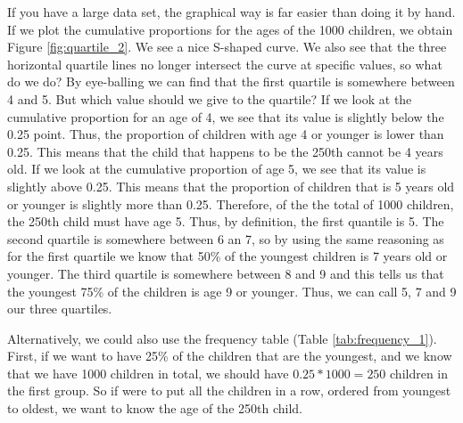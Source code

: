 \begin{kframe}


{\ttfamily\noindent\bfseries{}}\end{kframe}

If you have a large data set, the graphical way is far easier than doing it by hand. If we plot the cumulative proportions for the ages of the 1000 children, we obtain Figure \ref{fig:quartile_2}. We see a nice S-shaped curve. We also see that the three horizontal quartile lines no longer intersect the curve at specific values, so what do we do? By eye-balling we can find that the first quartile is somewhere between 4 and 5. But which value should we give to the quartile? If we look at the cumulative proportion for an age of 4, we see that its value is slightly below the 0.25 point. Thus, the proportion of children with age 4 or younger is lower than 0.25. This means that the child that happens to be the 250th cannot be 4 years old. If we look at the cumulative proportion of age 5, we see that its value is slightly above 0.25. This means that the proportion of children that is 5 years old or younger is slightly more than 0.25. Therefore, of the the total of 1000 children, the 250th child must have age 5. Thus, by definition, the first quantile is 5. 
The second quartile is somewhere between 6 an 7, so by using the same reasoning as for the first quartile we know that 50\% of the youngest children is 7 years old or younger. The third quartile is somewhere between 8 and 9 and this tells us that the youngest 75\% of the children is age 9 or younger. Thus, we can call 5, 7 and 9 our three quartiles.



\begin{kframe}


{\ttfamily\noindent\bfseries{}}\end{kframe}


Alternatively, we could also use the frequency table (Table \ref{tab:frequency_1}). First, if we want to have 25\% of the children that are the youngest, and we know that we have 1000 children in total, we should have $0.25 * 1000=250$ children in the first group. So if were to put all the children in a row, ordered from youngest to oldest, we want to know the age of the 250th child.

